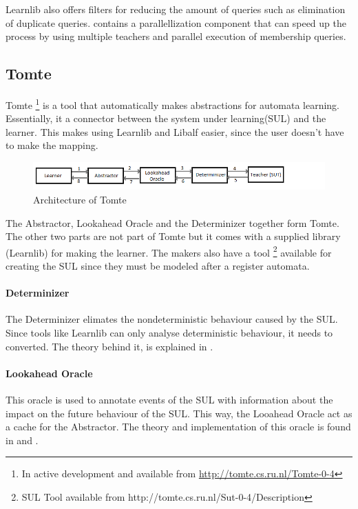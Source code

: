 \documentclass[multi,crop=false,class=article]{standalone}
\begin{document}
Learnlib also offers filters for reducing the amount of queries such as
elimination of duplicate queries. %
contains a parallellization component that can speed up the process by using
multiple teachers and parallel execution of membership
queries\cite{Henrix15}\cite{Howar2012}.

\subsection{Tomte}
\label{ssec:tomte}
Tomte \footnote{In active development and available from
\url{http://tomte.cs.ru.nl/Tomte-0-4}} is a tool that automatically makes
abstractions for automata learning. Essentially, it a connector between the
system under learning(SUL) and the learner. This makes using Learnlib and Libalf
easier, since the user doesn't have to make the mapping.

\begin{figure}[!ht]
	\includegraphics[width=\textwidth]{Tool_images/tomte_network.png}
	\caption{Architecture of Tomte}
	\label{fig:tomte_arch_interactoin}
\end{figure}

The Abstractor, Lookahead Oracle and the Determinizer together form Tomte. The
other two parts are not part of Tomte but it comes with a supplied library
(Learnlib) for making the learner. The makers also have a tool \footnote{SUL
Tool available from http://tomte.cs.ru.nl/Sut-0-4/Description} available for
creating the SUL since they must be modeled after a register automata.

\paragraph{Determinizer} The Determinizer elimates the nondeterministic
behaviour caused by the SUL. Since tools like Learnlib can only analyse
deterministic behaviour, it needs to converted. The theory behind it, is
explained in \cite{Aarts2015}.

\paragraph{Lookahead Oracle} This oracle is used to annotate events of the SUL
with information about the impact on the future behaviour of the SUL. This way,
the Looahead Oracle act as a cache for the Abstractor. The theory and
implementation of this oracle is found in \cite{Aarts2014} and \cite{tomte14}.
\end{document}
